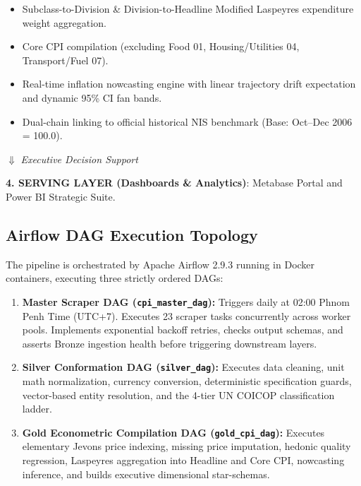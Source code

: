 \documentclass[11pt,a4paper,oneside]{article}
\begin{document}
\begin{center}
\begin{tcolorbox}[colback=white,colframe=NavyBlue,width=\textwidth,title=\bfseries Medallion Data Platform Flow]
\begin{itemize}[noitemsep]
    \item Subclass-to-Division \& Division-to-Headline Modified Laspeyres expenditure weight aggregation.
    \item Core CPI compilation (excluding Food 01, Housing/Utilities 04, Transport/Fuel 07).
    \item Real-time inflation nowcasting engine with linear trajectory drift expectation and dynamic 95\% CI fan bands.
    \item Dual-chain linking to official historical NIS benchmark (Base: Oct--Dec 2006 = 100.0).
\end{itemize}
\centering $\Downarrow$ \textit{Executive Decision Support} \\
\raggedright
\textbf{4. SERVING LAYER (Dashboards \& Analytics)}: Metabase Portal and Power BI Strategic Suite.
\end{tcolorbox}
\end{center}

\subsection{Airflow DAG Execution Topology}
The pipeline is orchestrated by Apache Airflow 2.9.3 running in Docker containers, executing three strictly ordered DAGs:
\begin{enumerate}
    \item \textbf{Master Scraper DAG (\texttt{cpi\_master\_dag}):}
        Triggers daily at 02:00 Phnom Penh Time (UTC+7). Executes 23 scraper tasks concurrently across worker pools. Implements exponential backoff retries, checks output schemas, and asserts Bronze ingestion health before triggering downstream layers.
    \item \textbf{Silver Conformation DAG (\texttt{silver\_dag}):}
        Executes data cleaning, unit math normalization, currency conversion, deterministic specification guards, vector-based entity resolution, and the 4-tier UN COICOP classification ladder.
    \item \textbf{Gold Econometric Compilation DAG (\texttt{gold\_cpi\_dag}):}
        Executes elementary Jevons price indexing, missing price imputation, hedonic quality regression, Laspeyres aggregation into Headline and Core CPI, nowcasting inference, and builds executive dimensional star-schemas.
\end{enumerate}

\newpage

\end{document}
